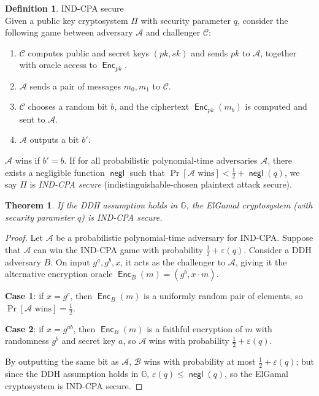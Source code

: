 \documentclass[11pt,twoside,a4paper]{article}
\DeclareMathOperator{\negl}{\mathsf{negl}}
\DeclareMathOperator{\Enc}{\mathsf{Enc}}
\newtheorem{theorem}{Theorem}[section]
\theoremstyle{definition}
\newtheorem{definition}{Definition}[section]
\begin{document}
\begin{definition}{IND-CPA secure}\\
    Given a public key cryptosystem \(\Pi\) with security parameter \(q\), consider the following game between adversary \(\mathcal{A}\) and challenger \(\mathcal{C}\):
    \begin{enumerate}
        \item \(\mathcal{C}\) computes public and secret keys \((pk, sk)\) and sends \(pk\) to \(\mathcal{A}\), together with oracle access to \(\Enc_{pk}\).
        \item \(\mathcal{A}\) sends a pair of messages \(m_0, m_1\) to \(\mathcal{C}\).
        \item \(\mathcal{C}\) chooses a random bit \(b\), and the ciphertext \(\Enc_{pk}(m_b)\) is computed and sent to \(\mathcal{A}\).
        \item \(\mathcal{A}\) outputs a bit \(b'\).
    \end{enumerate}
    \(\mathcal{A}\) wins if \(b'=b\). If for all probabilistic polynomial-time adversaries \(\mathcal{A}\), there exists a negligible function \(\negl\) such that \(\Pr[\mathcal{A}\text{ wins}]<\frac{1}{2}+\negl(q)\), we say \(\Pi\) is \textit{IND-CPA secure} (indistinguishable-chosen plaintext attack secure).
\end{definition}
\begin{theorem}
    If the DDH assumption holds in \(\mathbb{G}\), the ElGamal cryptosystem (with security parameter \(q\)) is IND-CPA secure.
\end{theorem}
\begin{proof}
    Let \(\mathcal{A}\) be a probabilistic polynomial-time adversary for IND-CPA. Suppose that \(\mathcal{A}\) can win the IND-CPA game with probability \(\frac{1}{2}+\varepsilon(q)\). Consider a DDH adversary \(B\). On input \(g^a, g^b, x\), it acts as the challenger to \(\mathcal{A}\), giving it the alternative encryption oracle \(\Enc_B(m)=(g^b, x\cdot m)\).
    
    \textbf{Case 1}: if \(x=g^c\), then \(\Enc_B(m)\) is a uniformly random pair of elements, so \(\Pr[\mathcal{A}\text{ wins}]=\frac{1}{2}\).
    
    \textbf{Case 2}: if \(x=g^{ab}\), then \(\Enc_B(m)\) is a faithful encryption of \(m\) with randomness \(g^b\) and secret key \(a\), so \(\mathcal{A}\) wins with probability \(\frac{1}{2}+\varepsilon(q)\).

    By outputting the same bit as \(\mathcal{A}\), \(\mathcal{B}\) wins with probability at most \(\frac{1}{2}+\varepsilon(q)\); but since the DDH assumption holds in \(\mathbb{G}\), \(\varepsilon(q)\leq\negl(q)\), so the ElGamal cryptosystem is IND-CPA secure.
\end{proof}
\end{document}
